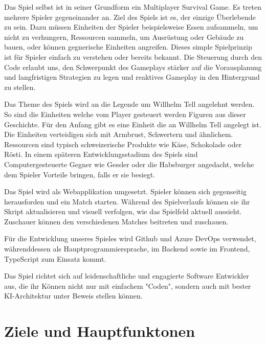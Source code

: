 \documentclass[a4paper, 11pt]{scrartcl}
\let\oldsection\section
\renewcommand\section{\clearpage\oldsection}
\begin{document}
Das Spiel selbst ist in seiner Grundform ein Multiplayer Survival Game.
Es treten mehrere Spieler gegeneinander an.
Ziel des Spiels ist es, der einzige Überlebende zu sein.
Dazu müssen Einheiten der Spieler beispielsweise Essen aufsammeln,
um nicht zu verhungern, Ressourcen sammeln, um Ausrüstung oder Gebäude zu bauen,
oder können gegnerische Einheiten angreifen.
Dieses simple Spielprinzip ist für Spieler einfach zu verstehen oder bereits bekannt.
Die Steuerung durch den Code erlaubt uns,
den Schwerpunkt des Gameplays stärker auf die Vorausplanung und langfristigen Strategien
zu legen und reaktives Gameplay in den Hintergrund zu stellen.

Das Theme des Spiels wird an die Legende um Willhelm Tell angelehnt werden. So sind die Einheiten welche vom Player
gesteuert werden Figuren aus dieser Geschichte. Für den Anfang gibt es eine Einheit die an Willhelm Tell angelegt ist.
Die Einheiten verteidigen sich mit Armbrust, Schwertern und ähnlichem. Ressourcen sind typisch schweizerische Produkte
wie Käse, Schokolade oder Rösti. In einem späteren Entwicklungsstadium des Spiels sind Computergesteuerte Gegner
wie Gessler oder die Habsburger angedacht, welche dem Spieler Vorteile bringen, falls er sie besiegt. 

Das Spiel wird als Webapplikation umgesetzt.
Spieler können sich gegenseitig herausforden und ein Match starten.
Während des Spielverlaufs können sie ihr Skript aktualisieren und visuell verfolgen,
wie das Spielfeld aktuell aussieht. Zuschauer können den verschiedenen Matches beitreten und zuschauen.

Für die Entwicklung unseres Spieles wird Github und Azure DevOps verwendet,
währenddessen als Hauptprogrammiersprache, im Backend sowie im Frontend, TypeScript zum Einsatz kommt.

Das Spiel richtet sich auf leidenschaftliche und engagierte Software Entwickler aus, die ihr Können nicht nur mit einfachem "Coden", sondern auch mit bester KI-Architektur unter Beweis stellen können.

\section{Ziele und Hauptfunktonen}
\end{document}
